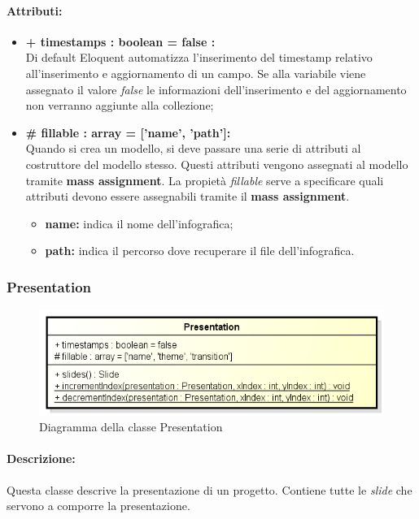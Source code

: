 	\paragraph{Attributi:}
		\begin{itemize}
			\item \textbf{+ timestamps : boolean = false :}\\
			Di default Eloquent automatizza l'inserimento del timestamp relativo all'inserimento e aggiornamento di un campo. Se alla variabile viene assegnato il valore \textit{false} le informazioni dell'inserimento e del aggiornamento non verranno aggiunte alla collezione;
			\item \textbf{\# fillable : array = [’name’, ’path’]:}\\
			Quando si crea un modello, si deve passare una serie di attributi al costruttore del modello stesso. Questi attributi vengono assegnati al modello tramite \textbf{mass assignment}. La propietà \textit{fillable} serve a specificare quali attributi devono essere assegnabili tramite il \textbf{mass assignment}.
			\begin{itemize}
				\item \textbf{name:} indica il nome dell'infografica;
				\item \textbf{path:} indica il percorso dove recuperare il file dell'infografica.
			\end{itemize}
		\end{itemize}
\newpage


\subsubsection{Presentation}

	\begin{figure}[h]
		\centering
		\includegraphics[width=0.8\linewidth]{img/back_end_premi_model_presentation}
		\caption[Diagramma della classe Presentation]{Diagramma della classe Presentation}
		\label{fig:back_end_premi_model_presentation}
	\end{figure}


	\paragraph{Descrizione:}
	Questa classe descrive la presentazione di un progetto. Contiene tutte le \textit{slide} che servono a comporre la presentazione.

